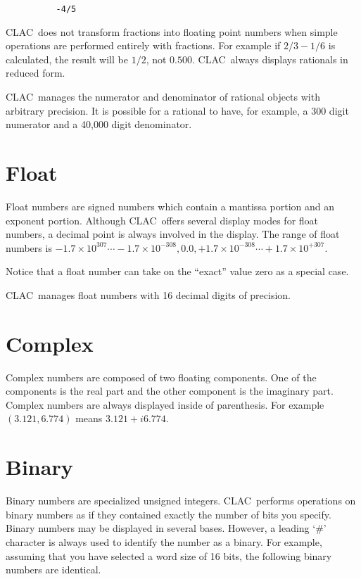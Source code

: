 \documentclass{report}
\newcommand{\CLAC}{CLAC}
\begin{document}
\begin{verbatim}
          -4/5
\end{verbatim}

\CLAC\ does not transform fractions into floating point numbers when
simple operations are performed entirely with fractions. For example if
$2/3 - 1/6$ is calculated, the result will be $1/2$, not $0.500$. \CLAC\ 
always displays rationals in reduced form.

\CLAC\ manages the numerator and denominator of rational objects with
arbitrary precision. It is possible for a rational to have, for example, a
300 digit numerator and a 40,000 digit denominator.

\section{Float}

Float numbers are signed numbers which contain a mantissa portion and an
exponent portion. Although \CLAC\ offers several display modes for float
numbers, a decimal point is always involved in the display. The range of
float numbers is $-1.7\times 10^{307} \cdots -1.7\times 10^{-308}, 0.0,
+1.7\times 10^{-308} \cdots +1.7\times 10^{+307}$.

Notice that a float number can take on the ``exact'' value zero as a
special case.

\CLAC\ manages float numbers with 16 decimal digits of precision.

\section{Complex}

Complex numbers are composed of two floating components. One of the
components is the real part and the other component is the imaginary
part. Complex numbers are always displayed inside of parenthesis. For
example $(3.121, 6.774)$ means $3.121 + i 6.774$.

\section{Binary}

Binary numbers are specialized unsigned integers. \CLAC\ performs
operations on binary numbers as if they contained exactly the number of
bits you specify. Binary numbers may be displayed in several bases.
However, a leading `\#' character is always used to identify the number
as a binary. For example, assuming that you have selected a word size of
16 bits, the following binary numbers are identical.
\end{document}
